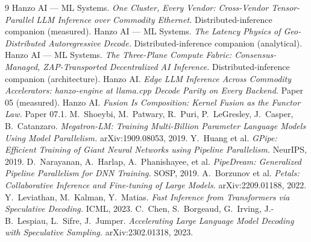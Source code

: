 \documentclass[11pt]{article}
\begin{document}
\begin{thebibliography}{9}
\small
{} Hanzo AI --- ML Systems. \emph{One Cluster, Every Vendor: Cross-Vendor Tensor-Parallel LLM
Inference over Commodity Ethernet.} Distributed-inference companion (measured).
 Hanzo AI --- ML Systems. \emph{The Latency Physics of Geo-Distributed Autoregressive
Decode.} Distributed-inference companion (analytical).
 Hanzo AI --- ML Systems. \emph{The Three-Plane Compute Fabric: Consensus-Managed,
ZAP-Transported Decentralized AI Inference.} Distributed-inference companion (architecture).
 Hanzo AI. \emph{Edge LLM Inference Across Commodity Accelerators: hanzo-engine at
llama.cpp Decode Parity on Every Backend.} Paper 05 (measured).
 Hanzo AI. \emph{Fusion Is Composition: Kernel Fusion as the Functor Law.} Paper 07.1.
 M.\ Shoeybi, M.\ Patwary, R.\ Puri, P.\ LeGresley, J.\ Casper, B.\ Catanzaro.
\emph{Megatron-LM: Training Multi-Billion Parameter Language Models Using Model Parallelism.}
arXiv:1909.08053, 2019.
 Y.\ Huang et al. \emph{GPipe: Efficient Training of Giant Neural Networks using Pipeline
Parallelism.} NeurIPS, 2019.
 D.\ Narayanan, A.\ Harlap, A.\ Phanishayee, et al. \emph{PipeDream: Generalized
Pipeline Parallelism for DNN Training.} SOSP, 2019.
 A.\ Borzunov et al. \emph{Petals: Collaborative Inference and Fine-tuning of Large
Models.} arXiv:2209.01188, 2022.
 Y.\ Leviathan, M.\ Kalman, Y.\ Matias. \emph{Fast Inference from Transformers via
Speculative Decoding.} ICML, 2023.
 C.\ Chen, S.\ Borgeaud, G.\ Irving, J.-B.\ Lespiau, L.\ Sifre, J.\ Jumper. \emph{Accelerating
Large Language Model Decoding with Speculative Sampling.} arXiv:2302.01318, 2023.
\end{thebibliography}
\end{document}
